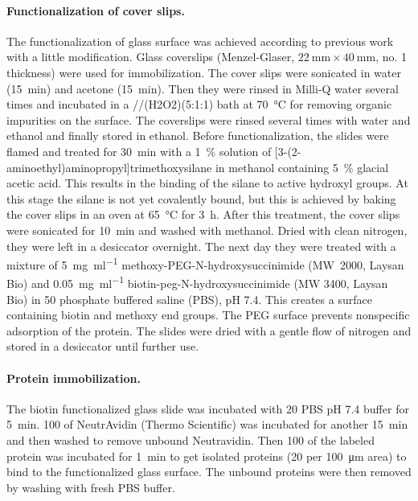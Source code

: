 \paragraph*{Functionalization of cover slips.}
The functionalization of glass surface was achieved according to previous work with a little modification.\cite{gupta2012involvement}
Glass coverslips (Menzel-Glaser, $\SI{22}{\mm} \times \SI{40}{\mm}$, no. 1 thickness) were used for immobilization.
The cover slips were sonicated in water (\SI{15}{\minute}) and acetone (\SI{15}{\minute}).
Then they were rinsed in Milli-Q water several times and incubated in a //\ce(H2O2)(5:1:1) bath at \SI{70}{\celsius} for removing organic impurities on the surface.
The coverslips were rinsed several times with water and ethanol and finally stored in ethanol.
Before functionalization, the slides were flamed and treated for \SI{30}{\minute} with a \SI{1}{\percent} solution of [3-(2-aminoethyl)aminopropyl]trimethoxysilane in methanol containing \SI{5}{\percent} glacial acetic acid. This results in the binding of the silane to active hydroxyl groups.
At this stage the silane is not yet covalently bound, but this is achieved by baking the cover slips in an oven at \SI{65}{\celsius} for \SI{3}{\hour}.
After this treatment, the cover slips were sonicated for \SI{10}{\minute} and washed with methanol.
Dried with clean nitrogen, they were left in a desiccator overnight. 
The next day they were treated with a mixture of \SI{5}{\mg\per\ml} methoxy-PEG-N-hydroxysuccinimide (MW~2000, Laysan Bio) and \SI{0.05}{\mg\per\ml} biotin-peg-N-hydroxysuccinimide (MW 3400, Laysan Bio) in \SI{50}{\mM} phosphate buffered saline (PBS), pH 7.4.
This creates a surface containing biotin and methoxy end groups.
The PEG surface prevents nonspecific adsorption of the protein.
The slides were dried with a gentle flow of nitrogen and stored in a desiccator until further use.

\paragraph*{Protein immobilization.}
The biotin functionalized glass slide was incubated with \SI{20}{\mM} PBS pH 7.4 buffer for \SI{5}{\minute}.
\SI{100}{\nM} of NeutrAvidin (Thermo Scientific) was incubated for another \SI{15}{\minute} and then washed to remove unbound Neutravidin. 
Then \SI{100}{\pM} of the labeled protein was incubated for \SI{1}{\minute} to get isolated proteins (20 per \SI{100}{\um} area) to bind to the functionalized glass surface.
The unbound proteins were then removed by washing with fresh PBS buffer.

